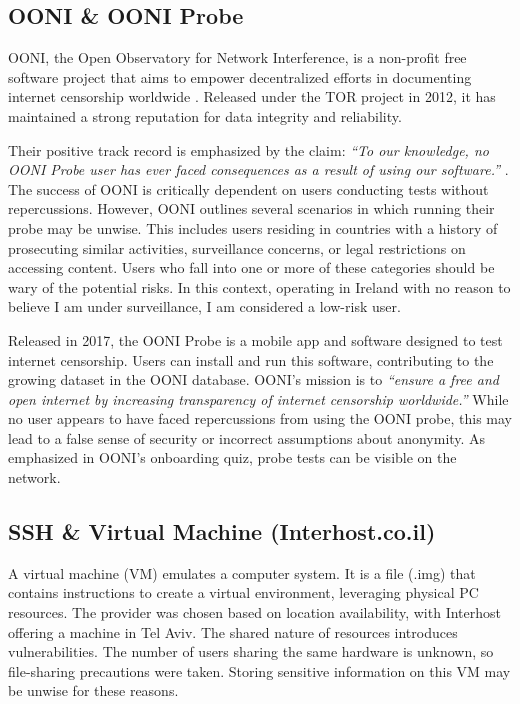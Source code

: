 \subsection{OONI \& OONI Probe}
OONI, the Open Observatory for Network Interference, is a non-profit free software project that aims to empower decentralized efforts in documenting internet censorship worldwide \cite{OONIAbout}. Released under the TOR project in 2012, it has maintained a strong reputation for data integrity and reliability.

Their positive track record is emphasized by the claim: \textit{“To our knowledge, no OONI Probe user has ever faced consequences as a result of using our software.”} \cite{OONIRisks}. The success of OONI is critically dependent on users conducting tests without repercussions. However, OONI outlines several scenarios in which running their probe may be unwise. This includes users residing in countries with a history of prosecuting similar activities, surveillance concerns, or legal restrictions on accessing content. Users who fall into one or more of these categories should be wary of the potential risks. In this context, operating in Ireland with no reason to believe I am under surveillance, I am considered a low-risk user.

Released in 2017, the OONI Probe is a mobile app and software designed to test internet censorship. Users can install and run this software, contributing to the growing dataset in the OONI database. OONI's mission is to \textit{“ensure a free and open internet by increasing transparency of internet censorship worldwide.”} While no user appears to have faced repercussions from using the OONI probe, this may lead to a false sense of security or incorrect assumptions about anonymity. As emphasized in OONI’s onboarding quiz, probe tests can be visible on the network.

\subsection{SSH \& Virtual Machine (Interhost.co.il)}
A virtual machine (VM) emulates a computer system. It is a file (.img) that contains instructions to create a virtual environment, leveraging physical PC resources. The provider was chosen based on location availability, with Interhost offering a machine in Tel Aviv. The shared nature of resources introduces vulnerabilities. The number of users sharing the same hardware is unknown, so file-sharing precautions were taken. Storing sensitive information on this VM may be unwise for these reasons.

